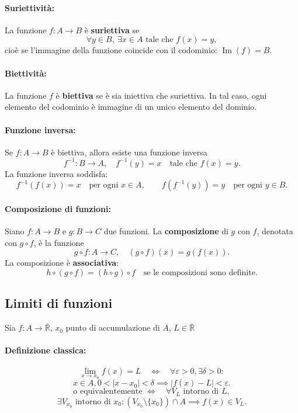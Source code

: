 \documentclass[12pt,a4paper]{article}
\begin{document}
\paragraph{Suriettività:}  
La funzione \( f : A \to B \) è \textbf{suriettiva} se
\[
\forall y \in B,\ \exists x \in A \text{ tale che } f(x) = y,
\]
cioè se l'immagine della funzione coincide con il codominio: \( \operatorname{Im}(f) = B \).

\paragraph{Biettività:}  
La funzione \( f \) è \textbf{biettiva} se è sia iniettiva che suriettiva.  
In tal caso, ogni elemento del codominio è immagine di un unico elemento del dominio.

\paragraph{Funzione inversa:}  
Se \( f : A \to B \) è biettiva, allora esiste una funzione inversa
\[
f^{-1} : B \to A, \quad f^{-1}(y) = x \quad \text{tale che } f(x) = y.
\]
La funzione inversa soddisfa:
\[
f^{-1}(f(x)) = x \quad \text{per ogni } x \in A, \qquad f(f^{-1}(y)) = y \quad \text{per ogni } y \in B.
\]

\paragraph{Composizione di funzioni:}  
Siano \( f : A \to B \) e \( g : B \to C \) due funzioni.  
La \textbf{composizione} di \( g \) con \( f \), denotata con \( g \circ f \), è la funzione
\[
g \circ f : A \to C, \quad (g \circ f)(x) = g(f(x)).
\]
La composizione è \textbf{associativa}:  
\[
h \circ (g \circ f) = (h \circ g) \circ f \quad \text{se le composizioni sono definite.}
\]
\subsection*{Limiti di funzioni}
Sia \( f : A \to \bar{\mathbb{R}} \), \( x_0 \) punto di accumulazione di \( A \), \( L \in \bar{\mathbb{R}}\)

\paragraph{Definizione classica:}
\[
\lim_{x \to x_0} f(x) = L \quad \Longleftrightarrow \quad \forall \varepsilon > 0, \exists \delta > 0 :
\]
\[
x \in A, 0 < |x - x_0| < \delta \implies |f(x) - L| < \varepsilon.
\]
\[\text{o equivalentemente }\Longleftrightarrow \quad \forall V_L \text{ intorno di } L,
\]
\[
\exists V_{x_0} \text{ intorno di } x_0 : (V_{x_0} \setminus \{x_0\}) \cap A \implies f(x) \in V_L.
\]
\end{document}
